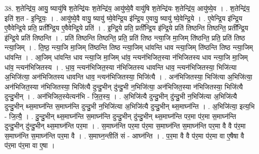 \documentclass[17pt]{extarticle}
\begin{document}
38. श॒तेन्द्रि॑य॒ आयु॒ ष्यायु॑षि श॒तेन्द्रि॑यः श॒तेन्द्रि॑य॒ आयु॑ष्ये॒वै वायु॑षि श॒तेन्द्रि॑यः श॒तेन्द्रि॑य॒ आयु॑ष्ये॒व । . श॒तेन्द्रि॑य॒ इति॑ श॒त - इ॒न्द्रि॒यः॒ । . आयु॑ष्ये॒वै वायु॒ ष्यायु॑ ष्ये॒वेन्द्रि॒य इ॑न्द्रि॒य ए॒वायु॒ ष्यायु॑ ष्ये॒वेन्द्रि॒ये । . ए॒वेन्द्रि॒य इ॑न्द्रि॒य ए॒वैवेन्द्रि॒ये प्रति॒ प्रती᳚न्द्रि॒य ए॒वैवेन्द्रि॒ये प्रति॑ । . इ॒न्द्रि॒ये प्रति॒ प्रती᳚न्द्रि॒य इ॑न्द्रि॒ये प्रति॑ तिष्ठन्ति तिष्ठन्ति॒ प्रती᳚न्द्रि॒य इ॑न्द्रि॒ये प्रति॑ तिष्ठन्ति । . प्रति॑ तिष्ठन्ति तिष्ठन्ति॒ प्रति॒ प्रति॑ तिष्ठ न्त्या॒जि मा॒जिम् ति॑ष्ठन्ति॒ प्रति॒ प्रति॑ तिष्ठ न्त्या॒जिम् । . ति॒ष्ठ॒ न्त्या॒जि मा॒जिम् ति॑ष्ठन्ति तिष्ठ न्त्या॒जिम् धा॑वन्ति धाव न्त्या॒जिम् ति॑ष्ठन्ति तिष्ठ न्त्या॒जिम् धा॑वन्ति । . आ॒जिम् धा॑वन्ति धाव न्त्या॒जि मा॒जिम् धा॑व॒ न्त्यन॑भिजित॒स्या न॑भिजितस्य धाव न्त्या॒जि मा॒जिम् धा॑व॒ न्त्यन॑भिजितस्य । . धा॒व॒ न्त्यन॑भिजित॒स्या न॑भिजितस्य धावन्ति धाव॒ न्त्यन॑भिजितस्या॒ भिजि॑त्या अ॒भिजि॑त्या॒ अन॑भिजितस्य धावन्ति धाव॒ न्त्यन॑भिजितस्या॒ भिजि॑त्यै । . अन॑भिजितस्या॒ भिजि॑त्या अ॒भिजि॑त्या॒ अन॑भिजित॒स्या न॑भिजितस्या॒ भिजि॑त्यै दुन्दु॒भीन् दु॑न्दु॒भी न॒भिजि॑त्या॒ अन॑भिजित॒स्या न॑भिजितस्या॒ भिजि॑त्यै दुन्दु॒भीन् । . अन॑भिजित॒स्येत्यन॑भि - जि॒त॒स्य॒ । . अ॒भिजि॑त्यै दुन्दु॒भीन् दु॑न्दु॒भी न॒भिजि॑त्या अ॒भिजि॑त्यै दुन्दु॒भीन् थ्स॒माघ्न॑न्ति स॒माघ्न॑न्ति दुन्दु॒भी न॒भिजि॑त्या अ॒भिजि॑त्यै दुन्दु॒भीन् थ्स॒माघ्न॑न्ति । . अ॒भिजि॑त्या॒ इत्य॒भि - जि॒त्यै॒ । . दु॒न्दु॒भीन् थ्स॒माघ्न॑न्ति स॒माघ्न॑न्ति दुन्दु॒भीन् दु॑न्दु॒भीन् थ्स॒माघ्न॑न्ति पर॒मा प॑र॒मा स॒माघ्न॑न्ति दुन्दु॒भीन् दु॑न्दु॒भीन् थ्स॒माघ्न॑न्ति पर॒मा । . स॒माघ्न॑न्ति पर॒मा प॑र॒मा स॒माघ्न॑न्ति स॒माघ्न॑न्ति पर॒मा वै वै प॑र॒मा स॒माघ्न॑न्ति स॒माघ्न॑न्ति पर॒मा वै । . स॒माघ्न॒न्तीति॑ सं - आघ्न॑न्ति । . प॒र॒मा वै वै प॑र॒मा प॑र॒मा वा ए॒षैषा वै प॑र॒मा प॑र॒मा वा ए॒षा । \newline
\end{document}
